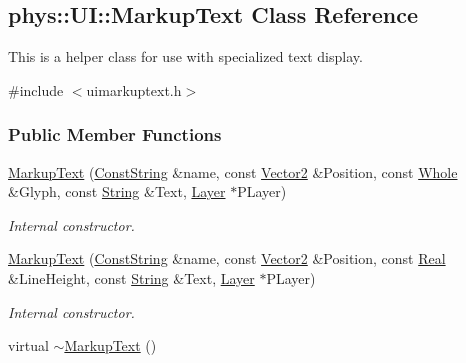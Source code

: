 \hypertarget{classphys_1_1UI_1_1MarkupText}{
\subsection{phys::UI::MarkupText Class Reference}
\label{d7/d23/classphys_1_1UI_1_1MarkupText}
}


This is a helper class for use with specialized text display.  




{\ttfamily \#include $<$uimarkuptext.h$>$}

\subsubsection*{Public Member Functions}
\begin{DoxyCompactItemize}
\item 
\hyperlink{classphys_1_1UI_1_1MarkupText_af22d52732e11ae4f6e037751fe3ea6a3}{MarkupText} (\hyperlink{namespacephys_a5ce5049f8b4bf88d6413c47b504ebb31}{ConstString} \&name, const \hyperlink{classphys_1_1Vector2}{Vector2} \&Position, const \hyperlink{namespacephys_a460f6bc24c8dd347b05e0366ae34f34a}{Whole} \&Glyph, const \hyperlink{namespacephys_aa03900411993de7fbfec4789bc1d392e}{String} \&Text, \hyperlink{classphys_1_1UI_1_1Layer}{Layer} $\ast$PLayer)
\begin{DoxyCompactList}\small\item\em Internal constructor. \item\end{DoxyCompactList}\item 
\hyperlink{classphys_1_1UI_1_1MarkupText_abc0232756941cd10002d0d7fa6bddabe}{MarkupText} (\hyperlink{namespacephys_a5ce5049f8b4bf88d6413c47b504ebb31}{ConstString} \&name, const \hyperlink{classphys_1_1Vector2}{Vector2} \&Position, const \hyperlink{namespacephys_af7eb897198d265b8e868f45240230d5f}{Real} \&LineHeight, const \hyperlink{namespacephys_aa03900411993de7fbfec4789bc1d392e}{String} \&Text, \hyperlink{classphys_1_1UI_1_1Layer}{Layer} $\ast$PLayer)
\begin{DoxyCompactList}\small\item\em Internal constructor. \item\end{DoxyCompactList}\item 
\hypertarget{classphys_1_1UI_1_1MarkupText_a7c5d8033801123c938089ef9ca647f01}{
virtual \hyperlink{classphys_1_1UI_1_1MarkupText_a7c5d8033801123c938089ef9ca647f01}{$\sim$MarkupText} ()}
\label{d7/d23/classphys_1_1UI_1_1MarkupText_a7c5d8033801123c938089ef9ca647f01}


\end{DoxyCompactItemize}
